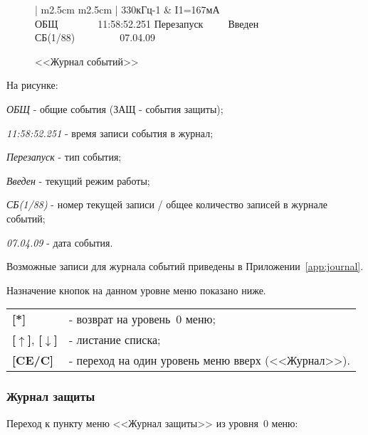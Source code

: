  \begin{figure}[H]
 	\centering
 	
	\begin{tabular}{| m{2.5cm}  m{2.5cm} |}
		\firsthline
		330кГц-1	& \raggedleft I1=167мА				\tabularnewline 
		 {ОБЩ~~~~~~~~11:58:52.251} 	\tabularnewline
		  {Перезапуск~~~~~Введен} 	\tabularnewline 
		 {СБ(1/88)~~~~~~~~~07.04.09}\tabularnewline 
		\lasthline
	\end{tabular} 
	
	\caption{<<Журнал событий>>}
	\label{fig:journal_event}
\end{figure}

\begin{ESKDexplanation}[1.5cm]
	\item[На рисунке:]
	\item \textit{ОБЩ} - общие события (ЗАЩ - события защиты);
	\item \textit{11:58:52.251} - время записи события в журнал;
	\item \textit{Перезапуск} - тип события;
	\item \textit{Введен} - текущий режим работы;
	\item \textit{СБ(1/88)} - номер текущей записи / общее количество записей в журнале событий;
	\item \textit{07.04.09} - дата события.
\end{ESKDexplanation}

Возможные записи для журнала событий приведены в Приложении~\ref{app:journal}.

Назначение кнопок на данном уровне меню показано ниже.
\begin{center}
	\begin{tabular}{p{2cm} p{15cm}}
		\textbf{[*]} & - возврат на уровень~0 меню; \tabularnewline
		\textbf{[$\uparrow$]}, \textbf{[$\downarrow$]}  & - листание списка; \tabularnewline
		\textbf{[CE/C]} & - переход на один уровень меню вверх (<<Журнал>>). \tabularnewline				
	\end{tabular}
\end{center} 


\subsubsection{Журнал защиты} \label{sssec:journal_def}

Переход к пункту меню <<Журнал защиты>> из уровня~0 меню: 

